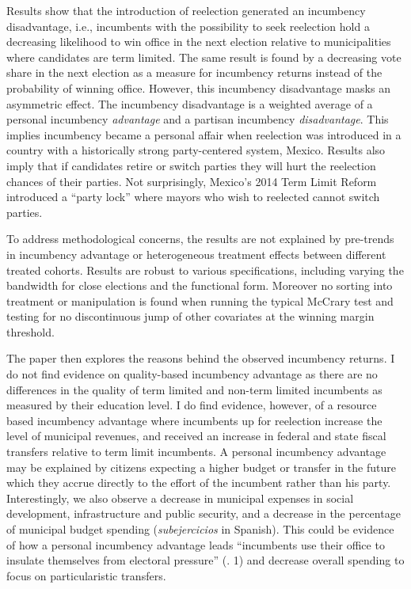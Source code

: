 \documentclass[12pt]{amsart}
\numberwithin{equation}{section}
\theoremstyle{definition}
\theoremstyle{definition}
\theoremstyle{definition}
\begin{document}
Results show that the introduction of reelection generated an incumbency disadvantage, i.e., incumbents with the possibility to seek reelection hold a decreasing likelihood to win office in the next election relative to municipalities where candidates are term limited. The same result is found by a decreasing vote share in the next election as a measure for incumbency returns instead of the probability of winning office. However, this incumbency disadvantage masks an asymmetric effect. The incumbency disadvantage is a weighted average of a personal incumbency \emph{advantage} and a partisan incumbency \emph{disadvantage}. This implies incumbency became a personal affair when reelection was introduced in a country with a historically strong party-centered system, Mexico. Results also imply that if candidates retire or switch parties they will hurt the reelection chances of their parties. Not surprisingly, Mexico's 2014 Term Limit Reform introduced a ``party lock'' where mayors who wish to reelected cannot switch parties.  

To address  methodological concerns, the results are not explained by pre-trends in incumbency advantage or heterogeneous treatment effects between different treated cohorts. Results are robust to various specifications, including varying the bandwidth for close elections and the functional form. Moreover no sorting into treatment or manipulation is found when running the typical McCrary test and testing for no discontinuous jump of other covariates at the winning margin threshold. 

The paper then explores the reasons behind the observed incumbency returns. I do not find evidence on quality-based incumbency advantage as there are no differences in the quality of term limited and non-term limited incumbents as measured by their education level. I do find evidence, however, of a resource based incumbency advantage where incumbents up for reelection increase the level of municipal revenues, and received an increase in federal and state fiscal transfers relative to term limit incumbents. A personal incumbency advantage may be explained by citizens expecting a higher budget or transfer in the future which they accrue directly to the effort of the incumbent rather than his party. Interestingly, we also observe a decrease in municipal expenses in social development, infrastructure and public security, and a decrease in the percentage of municipal budget spending (\emph{subejercicios} in Spanish). This could be evidence of how a personal incumbency advantage leads ``incumbents use their office to insulate themselves from electoral pressure'' (\citet{eggers_2017}. 1) and decrease overall spending to focus on particularistic transfers.
\end{document}
